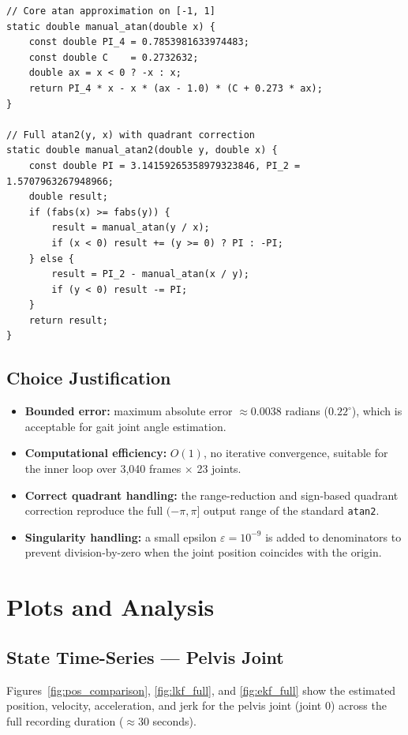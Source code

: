 \documentclass[12pt,a4paper]{article}
\begin{document}
\begin{lstlisting}[caption={Manual arctan and atan2 implementation}]
// Core atan approximation on [-1, 1]
static double manual_atan(double x) {
    const double PI_4 = 0.7853981633974483;
    const double C    = 0.2732632;
    double ax = x < 0 ? -x : x;
    return PI_4 * x - x * (ax - 1.0) * (C + 0.273 * ax);
}

// Full atan2(y, x) with quadrant correction
static double manual_atan2(double y, double x) {
    const double PI = 3.14159265358979323846, PI_2 = 1.5707963267948966;
    double result;
    if (fabs(x) >= fabs(y)) {
        result = manual_atan(y / x);
        if (x < 0) result += (y >= 0) ? PI : -PI;
    } else {
        result = PI_2 - manual_atan(x / y);
        if (y < 0) result -= PI;
    }
    return result;
}
\end{lstlisting}

\subsection{Choice Justification}
\begin{itemize}[noitemsep]
    \item \textbf{Bounded error:} maximum absolute error $\approx 0.0038$ radians ($0.22^\circ$),
          which is acceptable for gait joint angle estimation.
    \item \textbf{Computational efficiency:} $O(1)$, no iterative convergence,
          suitable for the inner loop over 3{,}040 frames $\times$ 23 joints.
    \item \textbf{Correct quadrant handling:} the range-reduction and sign-based
          quadrant correction reproduce the full $(-\pi, \pi]$ output range of the
          standard \texttt{atan2}.
    \item \textbf{Singularity handling:} a small epsilon $\varepsilon = 10^{-9}$
          is added to denominators to prevent division-by-zero when the joint
          position coincides with the origin.
\end{itemize}

\section{Plots and Analysis}

\subsection{State Time-Series — Pelvis Joint}
Figures~\ref{fig:pos_comparison}, \ref{fig:lkf_full}, and \ref{fig:ekf_full}
show the estimated position, velocity, acceleration, and jerk for the pelvis joint
(joint 0) across the full recording duration ($\approx 30$ seconds).
\end{document}
